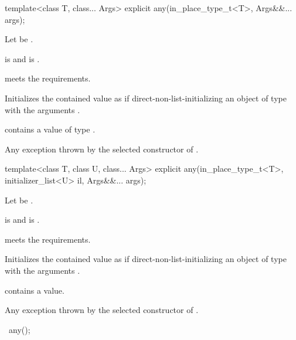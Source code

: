 %
\begin{itemdecl}
template<class T, class... Args>
  explicit any(in_place_type_t<T>, Args&&... args);
\end{itemdecl}

\begin{itemdescr}
\pnum
Let  be .

\pnum
\constraints
{} is  and
 is .

\pnum
\expects
{} meets the  requirements.

\pnum
\effects
Initializes the contained value as if direct-non-list-initializing an object of
type  with the arguments .

\pnum
\ensures
{} contains a value of type .

\pnum
\throws
Any exception thrown by the selected constructor of .
\end{itemdescr}

%
\begin{itemdecl}
template<class T, class U, class... Args>
  explicit any(in_place_type_t<T>, initializer_list<U> il, Args&&... args);
\end{itemdecl}

\begin{itemdescr}
\pnum
Let  be .

\pnum
\constraints
{} is  and
 is .

\pnum
\expects
{} meets the  requirements.

\pnum
\effects
Initializes the contained value as if direct-non-list-initializing an object of
type  with the arguments .

\pnum
\ensures
{} contains a value.

\pnum
\throws
Any exception thrown by the selected constructor of .
\end{itemdescr}

\begin{itemdecl}
~any();
\end{itemdecl}

